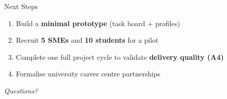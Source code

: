 \documentclass[aspectratio=169]{beamer}
\begin{document}
\begin{frame}{Next Steps}
  \begin{enumerate}
    \item Build a \textbf{minimal prototype} (task board + profiles)
    \item Recruit \textbf{5 SMEs} and \textbf{10 students} for a pilot
    \item Complete one full project cycle to validate \textbf{delivery quality (A4)}
    \item Formalise university career centre partnerships
  \end{enumerate}
  \vspace{1em}
  \centering
  \large\textit{Questions?}
\end{frame}
\end{document}
